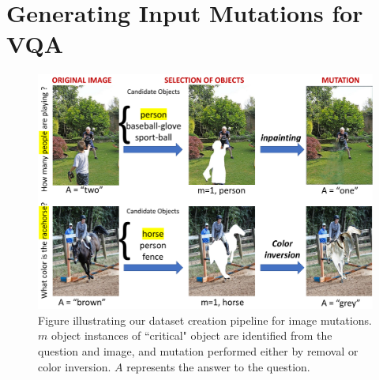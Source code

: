 \section{Generating Input Mutations for VQA}
\begin{figure}[t]
    \centering
    \includegraphics[width=\linewidth]{mutant/figures/mutant_creation.pdf}
    \caption{Figure illustrating our dataset creation pipeline for image mutations.
    $m$ object instances of ``critical" object are identified from the question and image, and mutation performed either by removal or color inversion.
    $A$ represents the answer to the question.}
    \label{fig:image_mutation}
\end{figure}

